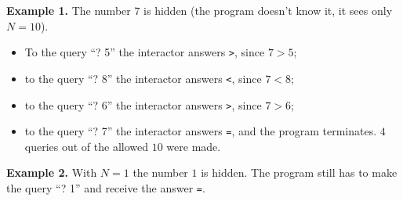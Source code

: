 \textbf{Example 1.} The number $7$ is hidden (the program doesn't know it, it sees only $N = 10$).

\begin{itemize}
\item To the query ``? 5'' the interactor answers \texttt{>}, since $7 > 5$;
\item to the query ``? 8'' the interactor answers \texttt{<}, since $7 < 8$;
\item to the query ``? 6'' the interactor answers \texttt{>}, since $7 > 6$;
\item to the query ``? 7'' the interactor answers \texttt{=}, and the program terminates. $4$ queries out of the allowed $10$ were made.
\end{itemize}

\textbf{Example 2.} With $N = 1$ the number $1$ is hidden. The program still has to make the query ``? 1'' and receive the answer \texttt{=}.
